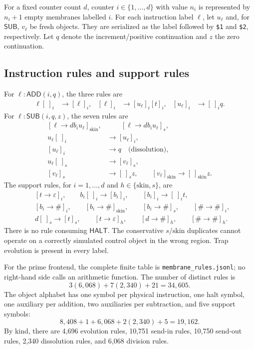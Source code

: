 \documentclass[11pt,letterpaper]{article}
\theoremstyle{definition}
\theoremstyle{remark}
\newcommand{\file}[1]{\nolinkurl{#1}}
\newcommand{\HALT}{\mathsf{HALT}}
\newcommand{\ADD}{\mathsf{ADD}}
\newcommand{\SUB}{\mathsf{SUB}}
\newcommand{\skin}{\mathrm{skin}}
\newcommand{\trap}{\#}
\newcommand{\eps}{\varepsilon}
\begin{document}
For a fixed counter count $d$, counter $i\in\{1,\ldots,d\}$ with value $n_i$ is represented by $n_i+1$ empty membranes labelled $i$. For each instruction label $\ell$, let $u_\ell$ and, for $\SUB$, $v_\ell$ be fresh objects. They are serialized as the label followed by \file{$1} and \file{$2}, respectively. Let $q$ denote the increment/positive continuation and $z$ the zero continuation.

\subsection{Instruction rules and support rules}
For $\ell:\ADD(i,q)$, the three rules are
\begin{align}\label{qoc:um:eq:addrules}
 \ell[\ ]_i&\longrightarrow[\ell]_i,&
 [\ell]_i&\longrightarrow[u_\ell]_i[t]_i,&
 [u_\ell]_i&\longrightarrow[\ ]_i q.
\end{align}
For $\ell:\SUB(i,q,z)$, the seven rules are
\begin{align}\label{qoc:um:eq:subrules}
 [\ell\to d b_i u_\ell]_{\skin},&\qquad [\ell\to d b_i u_\ell]_s,\\
 u_\ell[\ ]_i&\longrightarrow[u_\ell]_i,\nonumber\\
 [u_\ell]_i&\longrightarrow q\quad\text{(dissolution)},\nonumber\\
 u_\ell[\ ]_s&\longrightarrow[v_\ell]_s,\nonumber\\
 [v_\ell]_s&\longrightarrow[\ ]_s z,\qquad
 [v_\ell]_{\skin}\longrightarrow[\ ]_{\skin}z.\nonumber
\end{align}
The support rules, for $i=1,\ldots,d$ and $h\in\{\skin,s\}$, are
\begin{align*}
 &[t\to\eps]_i,\qquad b_i[\ ]_i\to[b_i]_i,\qquad
 [b_i]_i\to[\ ]_i t,\\
 &[b_i\to\trap]_i,\qquad [b_i\to\trap]_{\skin},\qquad
 [b_i\to\trap]_s,\qquad [\trap\to\trap]_i,\\
 &d[\ ]_s\to[t]_s,\qquad [t\to\eps]_h,\qquad
 [d\to\trap]_h,\qquad [\trap\to\trap]_h.
\end{align*}
There is no rule consuming $\HALT$. The conservative $s/\skin$ duplicates cannot operate on a correctly simulated control object in the wrong region. Trap evolution is present in every label.

For the prime frontend, the complete finite table is \file{membrane_rules.jsonl}; no right-hand side calls an arithmetic function. The number of distinct rules is
\[
 3(6{,}068)+7(2{,}340)+21=34{,}605.
\]
The object alphabet has one symbol per physical instruction, one halt symbol, one auxiliary per addition, two auxiliaries per subtraction, and five support symbols:
\[
 8{,}408+1+6{,}068+2(2{,}340)+5=19{,}162.
\]
By kind, there are 4,696 evolution rules, 10,751 send-in rules, 10,750 send-out rules, 2,340 dissolution rules, and 6,068 division rules.
\end{document}
